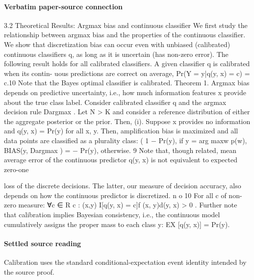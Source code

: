 \documentclass[10pt]{article}
\begin{document}
\paragraph{Verbatim paper-source connection}
\begin{ReviewVerbatim}
3.2     Theoretical Results: Argmax bias and continuous classifier
We first study the relationship between argmax bias and the properties of the continuous classifier. We show
that discretization bias can occur even with unbiased (calibrated) continuous classifiers q, as long as it is
uncertain (has non-zero error).
    The following result holds for all calibrated classifiers. A given classifier q is calibrated when its contin-
uous predictions are correct on average, Pr(Y = y|q(y, x) = c) = c.10 Note that the Bayes optimal classifier
is calibrated.
Theorem 1. Argmax bias depends on predictive uncertainty, i.e., how much information features x provide
about the true class label. Consider calibrated classifier q and the argmax decision rule Dargmax . Let N > K
and consider a reference distribution of either the aggregate posterior or the prior. Then,
  (i). Suppose x provides no information and q(y, x) = Pr(y) for all x, y. Then, amplification bias is
       maximized and all data points are classified as a plurality class:
                                                  (
                                                    1 − Pr(y), if y = arg maxw p(w),
                            BIAS(y, Dargmax ) =
                                                    − Pr(y),      otherwise.
   9 Note that, though related, mean average error of the continuous predictor q(y, x) is not equivalent to expected zero-one

loss of the discrete decisions. The latter, our measure of decision accuracy, also depends on how the continuous predictor is
discretized.                                n                                           o
  10 For all c of non-zero measure: ∀c ∈
                                                 R
                                             c : (x,y) I[q(y, x) = c]f (x, y)d(y, x) > 0 . Further note that calibration implies
Bayesian consistency, i.e., the continuous model cumulatively assigns the proper mass to each class y: EX [q(y, x)] = Pr(y).
\end{ReviewVerbatim}

\paragraph{Settled source reading}
\begin{sloppypar}
Calibration uses the standard conditional-\allowbreak{}expectation event identity intended by the source proof.\allowbreak{}
\end{sloppypar}
\end{document}
